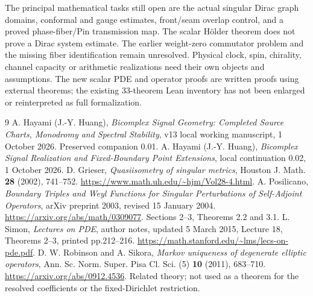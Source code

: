 \documentclass[11pt]{article}
\theoremstyle{remark}\newtheorem{remark}[theorem]{Remark}
\begin{document}
The principal mathematical tasks still open are the actual singular Dirac
graph domains, conformal and gauge estimates, front/seam overlap control,
and a proved phase-fiber/Pin transmission map. The scalar H\"older theorem
does not prove a Dirac system estimate. The earlier weight-zero commutator
problem and the missing fiber identification remain unresolved. Physical
clock, spin, chirality, channel capacity or arithmetic realizations need
their own objects and assumptions. The new scalar PDE and operator proofs
are written proofs using external theorems; the existing 33-theorem Lean
inventory has not been enlarged or reinterpreted as full formalization.

\begin{thebibliography}{9}
 A. Hayami (J.-Y. Huang), \emph{Bicomplex Signal Geometry:
 Completed Source Charts, Monodromy and Spectral Stability},
 v13 local working manuscript, 1 October 2026. Preserved companion 0.01.
 A. Hayami (J.-Y. Huang), \emph{Bicomplex Signal Realization
 and Fixed-Boundary Point Extensions}, local continuation 0.02, 1 October 2026.
 D. Grieser, \emph{Quasiisometry of singular metrics},
 Houston J. Math. \textbf{28} (2002), 741--752.
 \url{https://www.math.uh.edu/~hjm/Vol28-4.html}.
 A. Posilicano, \emph{Boundary Triples and Weyl Functions for
 Singular Perturbations of Self-Adjoint Operators}, arXiv preprint 2003,
 revised 15 January 2004.
 \url{https://arxiv.org/abs/math/0309077}. Sections 2--3, Theorems 2.2 and 3.1.
 L. Simon, \emph{Lectures on PDE}, author notes, updated
 5 March 2015, Lecture 18, Theorems 2--3, printed pp.212--216.
 \url{https://math.stanford.edu/~lms/lecs-on-pde.pdf}.
 D. W. Robinson and A. Sikora, \emph{Markov uniqueness of
 degenerate elliptic operators}, Ann. Sc. Norm. Super. Pisa Cl. Sci.
 (5) \textbf{10} (2011), 683--710.
 \url{https://arxiv.org/abs/0912.4536}. Related theory; not used as a theorem
 for the resolved coefficients or the fixed-Dirichlet restriction.
\end{thebibliography}
\end{document}
